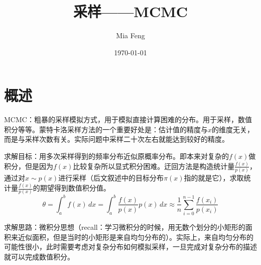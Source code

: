 \documentclass{ctexart}
\title{采样——MCMC} %
\author{Mia Feng} %
\date{\today} %
\begin{document}
\maketitle %




\section{概述}
MCMC：粗暴的采样模拟方式，用于模拟直接计算困难的分布。用于采样，数值积分等等。蒙特卡洛采样方法的一个重要好处是：估计值的精度与$x$的维度无关，而是与采样次数有关。实际问题中采样二十次左右就能达到较好的精度。

求解目标：用多次采样得到的频率分布近似原概率分布。即本来对复杂的$f\left(x\right)$做积分，但是因为$f\left(x\right)$比较复杂所以显式积分困难。迂回方法是构造统计量$\frac{f\left(x\right)}{p\left(x\right)}$，通过对$x\sim p\left(x\right)$进行采样（后文叙述中的目标分布$\pi\left(x\right)$指的就是它），求取统计量$\frac{f\left(x\right)}{p\left(x\right)}$的期望得到数值积分值。
\begin{equation}
\theta = \int_{a}^{b}f\left(x\right)\,dx=\int_{a}^{b}\frac{f\left(x\right)}{p\left(x\right)}p\left(x\right)\,dx\approx \frac{1}{n}\sum\limits_{i=0}^{n-1}\frac{f\left(x_i\right)}{p\left(x_i\right)}
\end{equation}

求解思路：微积分思想（recall：学习微积分的时候，用无数个划分的小矩形的面积来近似面积，但是当时的小矩形是来自均匀分布的）。实际上，来自均匀分布的可能性很小，此时需要考虑对复杂分布如何模拟采样，一旦完成对复杂分布的描述就可以完成数值积分。
\end{document}
